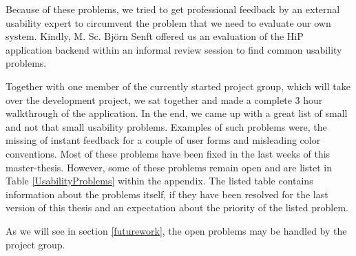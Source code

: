 Because of these problems, we tried to get professional feedback by an external usability expert to circumvent the problem that we need to evaluate our own system. Kindly, M. Sc. Bj\"orn Senft offered us an evaluation of the \ac{HiP} application backend within an informal review session to find common usability problems. 

Together with one member of the currently started project group, which will take over the development project, we sat together and made a complete 3 hour walkthrough of the application. In the end, we came up with a great list of small and not that small usability problems. Examples of such problems were, the missing of instant feedback for a couple of user forms and misleading color conventions. Most of these problems have been fixed in the last weeks of this master-thesis. However, some of these problems remain open and are listet in Table \ref{UsabilityProblems} within the appendix. The listed table contains information about the problems itself, if they have been resolved for the last version of this thesis and an expectation about the priority of the listed problem. 

As we will see in section \ref{futurework}, the open problems may be handled by the project group.

